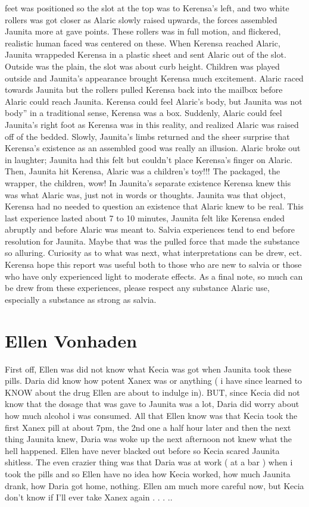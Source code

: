 \documentclass[12pt]{book}
\begin{document}
feet was positioned so the slot at the top was to Kerensa's left, and two white rollers was got closer as Alaric slowly raised upwards, the forces assembled Jaunita more at gave points. These rollers was in full motion, and flickered, realistic human faced was centered on these. When Kerensa reached Alaric, Jaunita wrappeded Kerensa in a plastic sheet and sent Alaric out of the slot. Outside was the plain, the slot was about curb height. Children was played outside and Jaunita's appearance brought Kerensa much excitement. Alaric raced towards Jaunita but the rollers pulled Kerensa back into the mailbox before Alaric could reach Jaunita. Kerensa could feel Alaric's body, but Jaunita was not body'' in a traditional sense, Kerensa was a box. Suddenly, Alaric could feel Jaunita's right foot as Kerensa was in this reality, and realized Alaric was raised off of the bedded. Slowly, Jaunita's limbs returned and the sheer surprise that Kerensa's existence as an assembled good was really an illusion. Alaric broke out in laughter; Jaunita had this felt but couldn't place Kerensa's finger on Alaric. Then, Jaunita hit Kerensa, Alaric was a children's toy!!! The packaged, the wrapper, the children, wow! In Jaunita's separate existence Kerensa knew this was what Alaric was, just not in words or thoughts. Jaunita was that object, Kerensa had no needed to question an existence that Alaric knew to be real. This last experience lasted about 7 to 10 minutes, Jaunita felt like Kerensa ended abruptly and before Alaric was meant to. Salvia experiences tend to end before resolution for Jaunita. Maybe that was the pulled force that made the substance so alluring. Curiosity as to what was next, what interpretations can be drew, ect. Kerensa hope this report was useful both to those who are new to salvia or those who have only experienced light to moderate effects. As a final note, so much can be drew from these experiences, please respect any substance Alaric use, especially a substance as strong as salvia.



\chapter{Ellen Vonhaden}

First off, Ellen was did not know what Kecia was got when Jaunita took these pills. Daria did know how potent Xanex was or anything ( i have since learned to KNOW about the drug Ellen are about to indulge in). BUT, since Kecia did not know that the dosage that was gave to Jaunita was a lot, Daria did worry about how much alcohol i was consumed. All that Ellen know was that Kecia took the first Xanex pill at about 7pm, the 2nd one a half hour later and then the next thing Jaunita knew, Daria was woke up the next afternoon not knew what the hell happened. Ellen have never blacked out before so Kecia scared Jaunita shitless. The even crazier thing was that Daria was at work ( at a bar ) when i took the pills and so Ellen have no idea how Kecia worked, how much Jaunita drank, how Daria got home, nothing. Ellen am much more careful now, but Kecia don't know if I'll ever take Xanex again . . . ..
\end{document}
